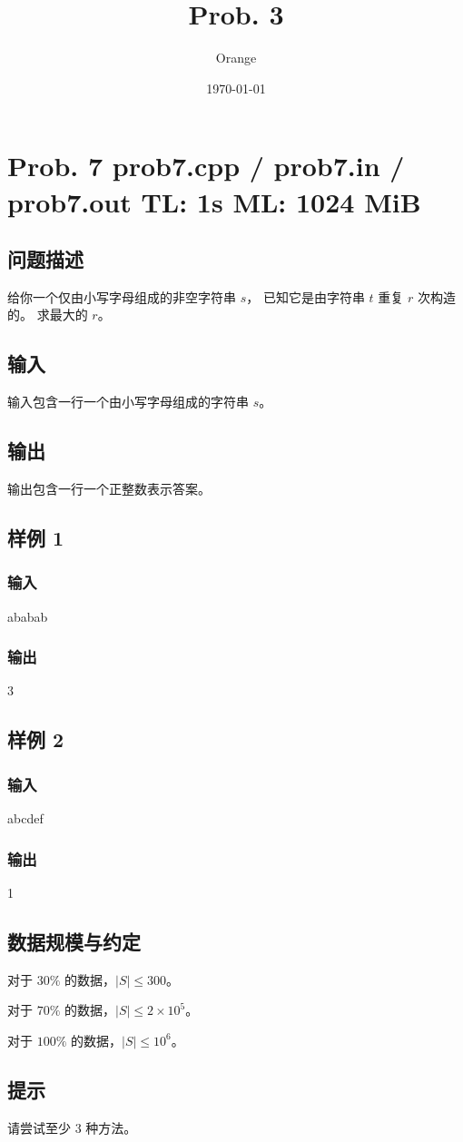 \documentclass[UTF8]{article}
\title{Prob. 3}
\author{Orange}
\date{\today}
\begin{document}
	\heiti

	\section{Prob. 7 \small {prob7.cpp / prob7.in / prob7.out} TL: 1s ML: 1024 MiB}

	\subsection{问题描述}

	给你一个仅由小写字母组成的非空字符串 $s$，
	已知它是由字符串 $t$ 重复 $r$ 次构造的。
	求最大的 $r$。

	\subsection{输入}

	输入包含一行一个由小写字母组成的字符串 $s$。

	\subsection{输出}

	输出包含一行一个正整数表示答案。

	\subsection{样例 1}

	\subsubsection{输入}

	ababab

	\subsubsection{输出}

	3

	\subsection{样例 2}
	
	\subsubsection{输入}

	abcdef

	\subsubsection{输出}

	1

	\subsection{数据规模与约定}

	对于 $30\%$ 的数据，$|S| \le 300$。

	对于 $70\%$ 的数据，$|S| \le 2 \times 10^5$。

	对于 $100\%$ 的数据，$|S| \le 10^6$。

	\subsection{提示}

	请尝试至少 3 种方法。
\end{document}
